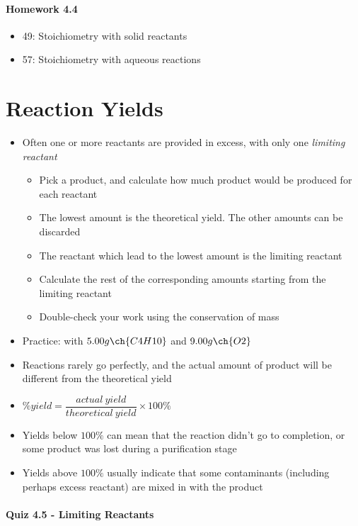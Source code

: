 \documentclass[12pt, openany, letterpaper]{memoir}
\begin{document}
\paragraph*{Homework 4.4}
\begin{itemize}
  \item 49: Stoichiometry with solid reactants
  \item 57: Stoichiometry with aqueous reactions
\end{itemize}

\section{Reaction Yields}
\begin{itemize}
  \item Often one or more reactants are provided in excess, with only one \emph{limiting reactant}
    \begin{itemize}
      \item Pick a product, and calculate how much product would be produced for each reactant
      \item The lowest amount is the theoretical yield. The other amounts can be discarded
      \item The reactant which lead to the lowest amount is the limiting reactant
      \item Calculate the rest of the corresponding amounts starting from the limiting reactant
      \item Double-check your work using the conservation of mass
    \end{itemize}
  \item Practice:  with $5.00g\ch{C4H10}$ and $9.00g\ch{O2}$
  \item Reactions rarely go perfectly, and the actual amount of product will be different from the theoretical yield
  \item $\%yield = \dfrac{actual~yield}{theoretical~yield}\times 100\%$
  \item Yields below $100\%$ can mean that the reaction didn't go to completion, or some product was lost during a purification stage
  \item Yields above $100\%$ usually indicate that some contaminants (including perhaps excess reactant) are mixed in with the product
\end{itemize}

\paragraph*{Quiz 4.5 - Limiting Reactants}
\end{document}
